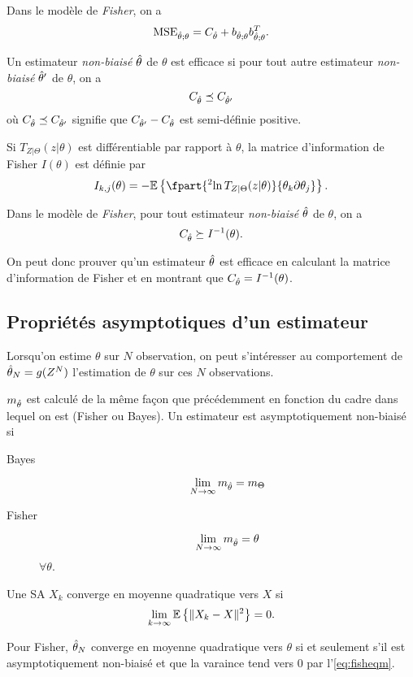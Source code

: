 Dans le modèle de \emph{Fisher}, on a
\begin{equation}
  \label{eq:fisheqm}
  \mathrm{MSE}_{\hat{\theta};\theta} = C_{\hat{\theta}} + b_{\hat{\theta};\theta}b_{\hat{\theta};\theta}^T.
\end{equation}

\begin{mydef}
  Un estimateur \emph{non-biaisé} $\hat{\theta}$ de $\theta$ est efficace si
  pour tout autre estimateur \emph{non-biaisé} $\hat{\theta}'$ de $\theta$, on a
  \[ C_{\hat{\theta}} \preceq C_{\hat{\theta}'} \]
  où $C_{\hat{\theta}} \preceq C_{\hat{\theta}'}$ signifie que $C_{\hat{\theta}'} - C_{\hat{\theta}}$
  est semi-définie positive.
\end{mydef}

\begin{mydef}
  Si $T_{Z|\Theta}(z|\theta)$ est différentiable par rapport à $\theta$,
  la matrice d'information de Fisher $I(\theta)$ est définie par
  \[ I_{k,j}(\theta) = -\Ex{\fpart{^2\ln T_{Z|\Theta}(z|\theta)}{\theta_k\partial\theta_j}}. \]
\end{mydef}

\begin{myineg}
  Dans le modèle de \emph{Fisher},
  pour tout estimateur \emph{non-biaisé} $\hat{\theta}$ de $\theta$,
  on a
  \[ C_{\hat{\theta}} \succeq I^{-1}(\theta). \]
\end{myineg}

On peut donc prouver qu'un estimateur $\hat{\theta}$ est efficace en calculant
la matrice d'information de Fisher
et en montrant que $C_{\hat{\theta}} = I^{-1}(\theta)$.

\subsection{Propriétés asymptotiques d'un estimateur}
Lorsqu'on estime $\theta$ sur $N$ observation,
on peut s'intéresser au comportement de $\hat{\theta}_N = g(Z^N)$ l'estimation
de $\theta$ sur ces $N$ observations.
\begin{mydef}
  $m_{\hat{\theta}}$ est calculé de la même façon que précédemment
  en fonction du cadre dans lequel on est (Fisher ou Bayes).
  Un estimateur est asymptotiquement non-biaisé si
  \begin{description}
    \item[Bayes]
      \[ \lim_{N\to\infty} m_{\hat{\theta}} = m_\Theta \]
    \item[Fisher]
      \[ \lim_{N\to\infty} m_{\hat{\theta}} = \theta \]
      $\forall \theta$.
  \end{description}
\end{mydef}
\begin{mydef}
  Une SA $X_k$ converge en moyenne quadratique vers $X$ si
  \[ \lim_{k\to\infty} \mathbb{E}\left\{\|X_k-X\|^2\right\} = 0. \]
\end{mydef}
Pour Fisher,
$\hat{\theta}_N$ converge en moyenne quadratique vers $\theta$ si
et seulement s'il est asymptotiquement non-biaisé et que la varaince tend
vers 0 par l'\eqref{eq:fisheqm}.

